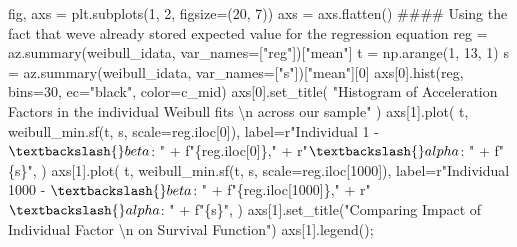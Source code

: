 \documentclass[
  letterpaper,
  DIV=11,
  numbers=noendperiod]{scrartcl}
\newenvironment{Shaded}{\begin{snugshade}}{\end{snugshade}}
\newcommand{\CharTok}[1]{\textcolor[rgb]{0.13,0.47,0.30}{#1}}
\newcommand{\CommentTok}[1]{\textcolor[rgb]{0.37,0.37,0.37}{#1}}
\newcommand{\DecValTok}[1]{\textcolor[rgb]{0.68,0.00,0.00}{#1}}
\newcommand{\NormalTok}[1]{\textcolor[rgb]{0.00,0.23,0.31}{#1}}
\newcommand{\OperatorTok}[1]{\textcolor[rgb]{0.37,0.37,0.37}{#1}}
\newcommand{\SpecialCharTok}[1]{\textcolor[rgb]{0.37,0.37,0.37}{#1}}
\newcommand{\SpecialStringTok}[1]{\textcolor[rgb]{0.13,0.47,0.30}{#1}}
\newcommand{\StringTok}[1]{\textcolor[rgb]{0.13,0.47,0.30}{#1}}
\newcommand{\VerbatimStringTok}[1]{\textcolor[rgb]{0.13,0.47,0.30}{#1}}
\begin{document}
\begin{Shaded}
\begin{Highlighting}[]
\NormalTok{fig, axs }\OperatorTok{=}\NormalTok{ plt.subplots(}\DecValTok{1}\NormalTok{, }\DecValTok{2}\NormalTok{, figsize}\OperatorTok{=}\NormalTok{(}\DecValTok{20}\NormalTok{, }\DecValTok{7}\NormalTok{))}
\NormalTok{axs }\OperatorTok{=}\NormalTok{ axs.flatten()}
\CommentTok{\#\#\#\# Using the fact that we\textquotesingle{}ve already stored expected value for the regression equation}
\NormalTok{reg }\OperatorTok{=}\NormalTok{ az.summary(weibull\_idata, var\_names}\OperatorTok{=}\NormalTok{[}\StringTok{"reg"}\NormalTok{])[}\StringTok{"mean"}\NormalTok{]}
\NormalTok{t }\OperatorTok{=}\NormalTok{ np.arange(}\DecValTok{1}\NormalTok{, }\DecValTok{13}\NormalTok{, }\DecValTok{1}\NormalTok{)}
\NormalTok{s }\OperatorTok{=}\NormalTok{ az.summary(weibull\_idata, var\_names}\OperatorTok{=}\NormalTok{[}\StringTok{"s"}\NormalTok{])[}\StringTok{"mean"}\NormalTok{][}\DecValTok{0}\NormalTok{]}
\NormalTok{axs[}\DecValTok{0}\NormalTok{].hist(reg, bins}\OperatorTok{=}\DecValTok{30}\NormalTok{, ec}\OperatorTok{=}\StringTok{"black"}\NormalTok{, color}\OperatorTok{=}\NormalTok{c\_mid)}
\NormalTok{axs[}\DecValTok{0}\NormalTok{].set\_title(}
    \StringTok{"Histogram of Acceleration Factors in the individual Weibull fits }\CharTok{\textbackslash{}n}\StringTok{ across our sample"}
\NormalTok{)}
\NormalTok{axs[}\DecValTok{1}\NormalTok{].plot(}
\NormalTok{    t,}
\NormalTok{    weibull\_min.sf(t, s, scale}\OperatorTok{=}\NormalTok{reg.iloc[}\DecValTok{0}\NormalTok{]),}
\NormalTok{    label}\OperatorTok{=}\VerbatimStringTok{r"Individual 1 {-} $\textbackslash{}beta$: "} \OperatorTok{+} \SpecialStringTok{f"}\SpecialCharTok{\{}\NormalTok{reg}\SpecialCharTok{.}\NormalTok{iloc[}\DecValTok{0}\NormalTok{]}\SpecialCharTok{\}}\SpecialStringTok{,"} \OperatorTok{+} \VerbatimStringTok{r"$\textbackslash{}alpha$: "} \OperatorTok{+} \SpecialStringTok{f"}\SpecialCharTok{\{}\NormalTok{s}\SpecialCharTok{\}}\SpecialStringTok{"}\NormalTok{,}
\NormalTok{)}
\NormalTok{axs[}\DecValTok{1}\NormalTok{].plot(}
\NormalTok{    t,}
\NormalTok{    weibull\_min.sf(t, s, scale}\OperatorTok{=}\NormalTok{reg.iloc[}\DecValTok{1000}\NormalTok{]),}
\NormalTok{    label}\OperatorTok{=}\VerbatimStringTok{r"Individual 1000 {-} $\textbackslash{}beta$: "} \OperatorTok{+} \SpecialStringTok{f"}\SpecialCharTok{\{}\NormalTok{reg}\SpecialCharTok{.}\NormalTok{iloc[}\DecValTok{1000}\NormalTok{]}\SpecialCharTok{\}}\SpecialStringTok{,"} \OperatorTok{+} \VerbatimStringTok{r"$\textbackslash{}alpha$: "} \OperatorTok{+} \SpecialStringTok{f"}\SpecialCharTok{\{}\NormalTok{s}\SpecialCharTok{\}}\SpecialStringTok{"}\NormalTok{,}
\NormalTok{)}
\NormalTok{axs[}\DecValTok{1}\NormalTok{].set\_title(}\StringTok{"Comparing Impact of Individual Factor }\CharTok{\textbackslash{}n}\StringTok{ on Survival Function"}\NormalTok{)}
\NormalTok{axs[}\DecValTok{1}\NormalTok{].legend()}\OperatorTok{;}
\end{Highlighting}
\end{Shaded}
\end{document}
